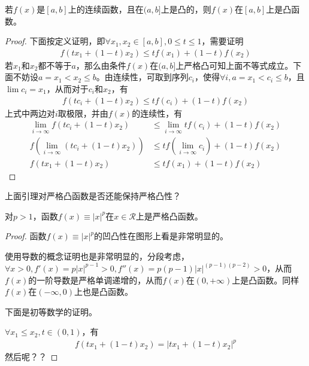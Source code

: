 \begin{lemma}\label{lemma:convexity-extension}
  若$f(x)$是$[a,b]$上的连续函数，且在$(a,b]$上是凸的，则$f(x)$在$[a,b]$上是凸函数。
\end{lemma}
\begin{proof}
  下面按定义证明，即$\forall x_1,x_2\in[a,b], 0\le t\le1$，需要证明
  \begin{align*}
    f\left(tx_1 + (1-t)x_2\right) \le tf(x_1) + (1-t)f(x_2)
  \end{align*}
  若$x_1$和$x_2$都不等于$a$，那么由条件$f(x)$在$(a,b]$上严格凸可知上面不等式成立。下面不妨设$a=x_1<x_2\le b$。由连续性，可取到序列$c_i$，使得$\forall i, a=x_1<c_i\le b$，且$\lim c_i = x_1$，从而对于$c_i$和$x_2$，有
  \begin{align*}
    f\left(tc_i + (1-t)x_2\right) \le tf(c_i) + (1-t)f(x_2)
  \end{align*}
  上式中两边对$i$取极限，并由$f(x)$的连续性，有
  \begin{align*}
    \lim_{i\to\infty}f\left(tc_i + (1-t)x_2\right) &\le \lim_{i\to\infty} tf(c_i) + (1-t)f(x_2)\\
    f\left(\lim_{i\to\infty}\left(tc_i + (1-t)x_2\right)\right) &\le tf( \lim_{i\to\infty} c_i) + (1-t)f(x_2)\\
    f\left(tx_1 + (1-t)x_2\right) &\le tf(x_1) + (1-t)f(x_2)
  \end{align*}
\end{proof}

\think 上面引理对严格凸函数是否还能保持严格凸性？

\begin{lemma}\label{lemma:convexity-of-power-function}
  对$p>1$，函数$f(x)\equiv\left|x\right|^p$在$x\in\mathcal{R}$上是严格凸函数。
\end{lemma}
\begin{proof}
  函数$f(x)\equiv|x|^p$的凹凸性在图形上看是非常明显的。

  使用导数的概念证明也是非常明显的，分段考虑，$\forall x>0, f'(x) = p\left|x\right|^{p-1}>0, f''(x)=p(p-1)\left|x\right|^{(p-1)(p-2)}>0$，从而$f(x)$的一阶导数是严格单调递增的，从而$f(x)$在$(0,+\infty)$上是凸函数。同样$f(x)$在$(-\infty,0)$上也是凸函数。

  下面是初等数学的证明。

  $\forall x_1\le x_2, t\in(0,1)$，有
  \begin{align*}
    f\left(tx_1 + (1-t)x_2\right) = \left|tx_1 + (1-t)x_2\right|^p
  \end{align*}
  {\color{red}然后呢？？}
\end{proof}

